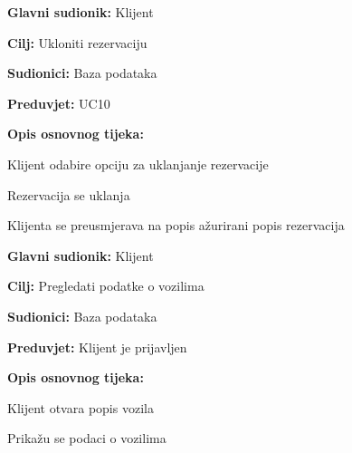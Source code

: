 \noindent {}
\begin{packed_item}
	
	\item \textbf{Glavni sudionik:} Klijent
	\item  \textbf{Cilj:} Ukloniti rezervaciju
	\item  \textbf{Sudionici:} Baza podataka
	\item  \textbf{Preduvjet:} UC10
	\item  \textbf{Opis osnovnog tijeka:}
	
	\item[] \begin{packed_enum}
		
		\item Klijent odabire opciju za uklanjanje rezervacije
		\item Rezervacija se uklanja
		\item Klijenta se preusmjerava na popis ažurirani popis rezervacija
		
	\end{packed_enum}
		
\end{packed_item}

\pagebreak

\noindent {}
\begin{packed_item}
	
	\item \textbf{Glavni sudionik:} Klijent
	\item \textbf{Cilj:} Pregledati podatke o vozilima
	\item \textbf{Sudionici:} Baza podataka
	\item \textbf{Preduvjet:} Klijent je prijavljen
	\item \textbf{Opis osnovnog tijeka:}
	
	\item[] \begin{packed_enum}
		
		\item Klijent otvara popis vozila
		\item Prikažu se podaci o vozilima
	
	\end{packed_enum}
\end{packed_item}

